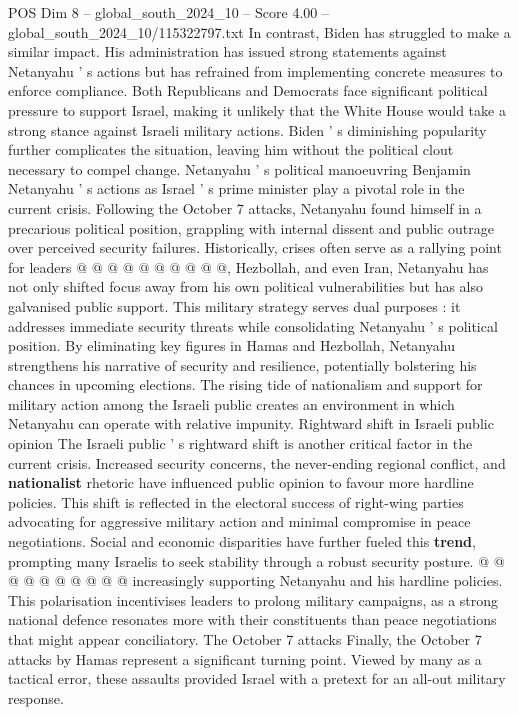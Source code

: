 \begin{textsample}{POS Dim 8 – global\_south\_2024\_10 – Score 4.00 – global\_south\_2024\_10/115322797.txt}
In contrast, Biden has struggled to make a similar impact.
His administration has issued strong statements against Netanyahu ' s actions but has refrained from implementing concrete measures to enforce compliance.
Both Republicans and Democrats face significant political pressure to support Israel, making it unlikely that the White House would take a strong stance against Israeli military actions.
Biden ' s diminishing popularity further complicates the situation, leaving him without the political clout necessary to compel change.
Netanyahu ' s political manoeuvring Benjamin Netanyahu ' s actions as Israel ' s prime minister play a pivotal role in the current crisis.
Following the October 7 attacks, Netanyahu found himself in a precarious political position, grappling with internal dissent and public outrage over perceived security failures.
Historically, crises often serve as a rallying point for leaders @ @ @ @ @ @ @ @ @ @, Hezbollah, and even Iran, Netanyahu has not only shifted focus away from his own political vulnerabilities but has also galvanised public support.
This military strategy serves dual purposes : it addresses immediate security threats while consolidating Netanyahu ' s political position.
By eliminating key figures in Hamas and Hezbollah, Netanyahu strengthens his narrative of security and resilience, potentially bolstering his chances in upcoming elections.
The rising tide of nationalism and support for military action among the Israeli public creates an environment in which Netanyahu can operate with relative impunity.
Rightward shift in Israeli public opinion The Israeli public ' s rightward shift is another critical factor in the current crisis.
Increased security concerns, the never-ending regional conflict, and \textbf{nationalist} rhetoric have influenced public opinion to favour more hardline policies.
This shift is reflected in the electoral success of right-wing parties advocating for aggressive military action and minimal compromise in peace negotiations.
Social and economic disparities have further fueled this \textbf{trend}, prompting many Israelis to seek stability through a robust security posture. @ @ @ @ @ @ @ @ @ @ increasingly supporting Netanyahu and his hardline policies.
This polarisation incentivises leaders to prolong military campaigns, as a strong national defence resonates more with their constituents than peace negotiations that might appear conciliatory.
The October 7 attacks Finally, the October 7 attacks by Hamas represent a significant turning point.
Viewed by many as a tactical error, these assaults provided Israel with a pretext for an all-out military response.

\end{textsample}

